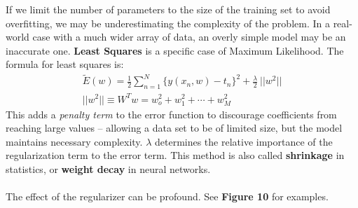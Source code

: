 \documentclass[11pt]{article} %
\begin{document}
If we limit the number of parameters to the size of the training set to avoid overfitting, we may be underestimating the complexity of the problem. In a real-world case with a much wider array of data, an overly simple model may be an inaccurate one. {\bf Least Squares} is a specific case of Maximum Likelihood. The formula for least squares is:
\begin{gather}
\tilde{E}(w) = \frac{1}{2} \sum_{n=1}^{N} \{y(x_n,w)-t_n\}^2 + \frac{\lambda}{2}~||w^2|| \\
||w^2|| \equiv W^Tw = w_o^2 + w_1^2 + \cdots + w_M^2
\end{gather}
This adds a {\em penalty term} to the error function to discourage coefficients from reaching large values -- allowing a data set to be of limited size, but the model maintains necessary complexity. $\lambda$ determines the relative importance of the regularization term to the error term. This method is also called {\bf shrinkage} in statistics, or {\bf weight decay} in neural networks. \\
~\\
The effect of the regularizer can be profound. See {\bf Figure 10} for examples.
\end{document}
